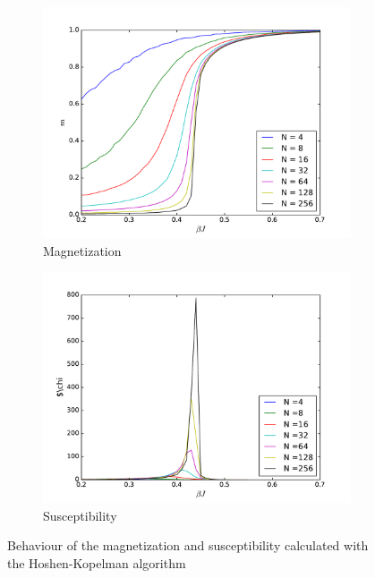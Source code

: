\documentclass[twoside]{article}
\begin{document}
\begin{multicols}{2}
\begin{figure}[b]
  \begin{subfigure}[b]{0.35\textwidth}
    \includegraphics[width=\textwidth]{images/magnetization.pdf}
    \caption{Magnetization}
    \label{magnetization}
  \end{subfigure}
  \begin{subfigure}[b]{0.35\textwidth}
    \includegraphics[width=\textwidth]{images/susceptibility.pdf}
    \caption{Susceptibility}
    \label{susceptibility}
  \end{subfigure}
  \caption{Behaviour of the magnetization and susceptibility calculated with the Hoshen-Kopelman algorithm}
\end{figure}



\end{multicols}
\end{document}
